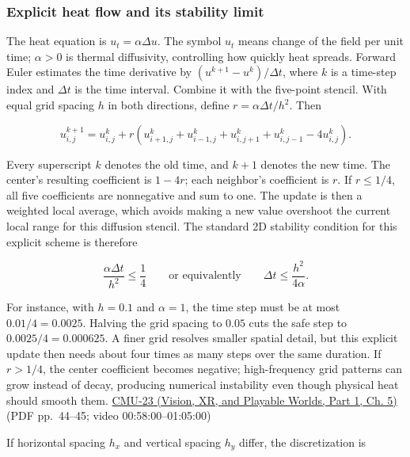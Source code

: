 \subsubsection{Explicit heat flow and its stability limit}\label{04-visual-computing-ii-ch030-explicit-heat-flow-and-its-stability-limit}

\hypertarget{04-visual-computing-ii-ch030-explicit-heat-flow-and-its-stability-limit}{}

The heat equation is \(u_t=\alpha\Delta u\). The symbol \(u_t\) means change of the field per unit time; \(\alpha>0\) is thermal diffusivity, controlling how quickly heat spreads. Forward Euler estimates the time derivative by \((u^{k+1}-u^k)/\Delta t\), where \(k\) is a time-step index and \(\Delta t\) is the time interval. Combine it with the five-point stencil. With equal grid spacing \(h\) in both directions, define \(r=\alpha\Delta t/h^2\). Then

\[
u_{i,j}^{k+1}=u_{i,j}^{k}+r\left(u_{i+1,j}^{k}+u_{i-1,j}^{k}+u_{i,j+1}^{k}+u_{i,j-1}^{k}-4u_{i,j}^{k}\right).
\]

Every superscript \(k\) denotes the old time, and \(k+1\) denotes the new time. The center's resulting coefficient is \(1-4r\); each neighbor's coefficient is \(r\). If \(r\le1/4\), all five coefficients are nonnegative and sum to one. The update is then a weighted local average, which avoids making a new value overshoot the current local range for this diffusion stencil. The standard 2D stability condition for this explicit scheme is therefore

\[
\frac{\alpha\Delta t}{h^2}\le\frac14
\qquad\text{or equivalently}\qquad
\Delta t\le\frac{h^2}{4\alpha}.
\]

For instance, with \(h=0.1\) and \(\alpha=1\), the time step must be at most \(0.01/4=0.0025\). Halving the grid spacing to \(0.05\) cuts the safe step to \(0.0025/4=0.000625\). A finer grid resolves smaller spatial detail, but this explicit update then needs about four times as many steps over the same duration. If \(r>1/4\), the center coefficient becomes negative; high-frequency grid patterns can grow instead of decay, producing numerical instability even though physical heat should smooth them. \href{../07-Vision-XR-and-Playable-Worlds-P01/main.pdf\#nameddest=04-visual-computing-ii-ch036-cmu-23---physically-based-animation-and-pdes}{CMU-23 (Vision, XR, and Playable Worlds, Part 1, Ch. 5)} (PDF pp.~44--45; video 00:58:00--01:05:00)

If horizontal spacing \(h_x\) and vertical spacing \(h_y\) differ, the discretization is

